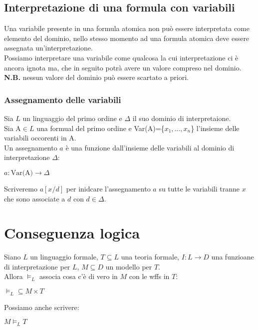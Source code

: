 \documentclass[../main.tex]{subfiles}
\begin{document}
   \subsection{Interpretazione di una formula con variabili}
   Una variabile presente in una formula atomica non può essere interpretata come elemento del dominio, nello stesso momento ad una formula atomica deve essere assegnata un'interpretazione.\\
   Possiamo interpretare una variabile come qualcosa la cui interpretazione ci è ancora ignota ma, che in seguito potrà avere un valore compreso nel dominio.\\
   \textbf{N.B.} nessun valore del dominio può essere scartato a priori.

   \subsubsection{Assegnamento delle variabili}
   Sia $L$ un linguaggio del primo ordine e $\Delta$ il suo dominio di interpretaione.\\
   Sia A$\in L$ una formual del primo ordine e Var(A)=\{$x_1, \dots , x_n$\} l'insieme delle variabili occorenti in A.\\
   Un assegnamento $a$ è una funzione dall'insieme delle variabili al dominio di interpretazione $\Delta$:
   \begin{center}
      $a: \text{Var(A)} \to \Delta$
   \end{center}
   Scriveremo $a[x/d]$ per inidcare l'assegnamento $a$ su tutte le variabili tranne $x$ che sono associate a $d$ con $d \in \Delta$.

   \section{Conseguenza logica}
   Siano $L$ un linguaggio formale, $T \subseteq L$ una teoria formale, $I : L \to D$ una funzioane di interpretazione per $L$, $M \subseteq D$ un modello per $T$.\\
   Allora $\models_L$ associa cosa c'è di vero in $M$ con le wffs in $T$:
   \begin{center}
      $\models_L \subseteq M \times T$
   \end{center}
   Possiamo anche scrivere:
   \begin{center}
      $M \models_L T$
   \end{center}
\end{document}

